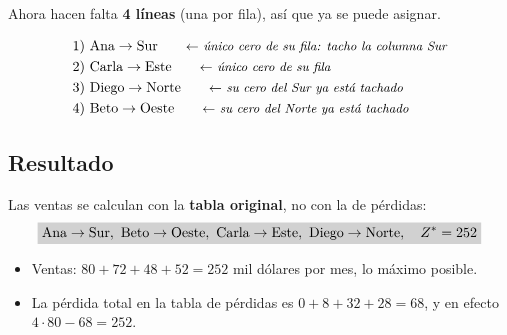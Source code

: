 \documentclass[11pt,a4paper]{article}
\let\pasobase\paso
\renewcommand{\paso}[1]{\needspace{7\baselineskip}\pasobase{#1}}
\newcommand{\rejilla}[3]{%
  \foreach \i in {2,...,#2}{\foreach \j in {2,...,#3}{%
    \draw[gray!55, thin] (#1-\i-\j.north west) rectangle (#1-\i-\j.south east);}}%
  \draw[thick] (#1-2-2.north west) rectangle (#1-#2-#3.south east);}
\newcommand{\lfila}[3]{\begin{pgfonlayer}{background}\draw[tapa] ($(#1-#2-2.west)+(-1.5pt,0)$) -- ($(#1-#2-#3.east)+(1.5pt,0)$);\end{pgfonlayer}}
\newcommand{\cero}[2]{\node[asignado] at (#1-#2) {};}
\newcommand{\pie}[4]{\node[font=\footnotesize, below=1mm, align=center] at ($(#1-#2-2.south west)!0.5!(#1-#2-#3.south east)$) {#4};}
\begin{document}
\begin{center}
\qquad
{}
\end{center}
Ahora hacen falta \textbf{4 líneas} (una por fila), así que ya se puede asignar.

\begin{align*}
&1)\ \text{Ana} \to \text{Sur} \nota{único cero de su fila: tacho la columna Sur}\\
&2)\ \text{Carla} \to \text{Este} \nota{único cero de su fila}\\
&3)\ \text{Diego} \to \text{Norte} \nota{su cero del Sur ya está tachado}\\
&4)\ \text{Beto} \to \text{Oeste} \nota{su cero del Norte ya está tachado}
\end{align*}

\subsection*{Resultado}
Las ventas se calculan con la \textbf{tabla original}, no con la de pérdidas:
\[
\res{\text{Ana} \to \text{Sur},\ \text{Beto} \to \text{Oeste},\ \text{Carla} \to \text{Este},\ \text{Diego} \to \text{Norte},\quad Z^* = 252}
\]
\begin{itemize}[itemsep=2pt]
  \item Ventas: $80 + 72 + 48 + 52 = 252$ mil dólares por mes, lo máximo posible.
  \item La pérdida total en la tabla de pérdidas es $0 + 8 + 32 + 28 = 68$, y en efecto $4 \cdot 80 - 68 = 252$.
\end{itemize}
\end{document}
